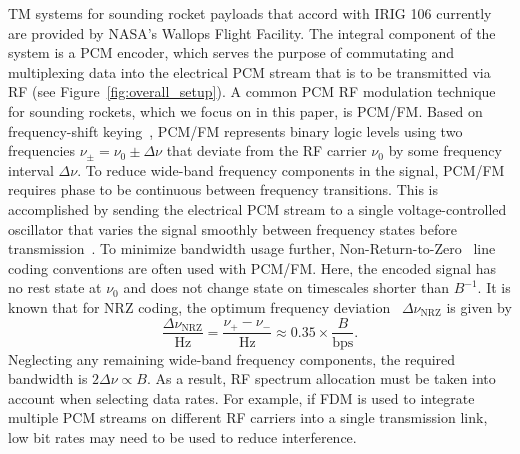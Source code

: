 \documentclass{ws-jai}
\begin{document}
TM systems for sounding rocket payloads that accord with IRIG 106 currently are provided by NASA's Wallops Flight Facility. The integral component of the system is a PCM encoder, which serves the purpose of commutating and multiplexing data into the electrical PCM stream that is to be transmitted via RF (see Figure~\ref{fig:overall_setup}). A common PCM RF modulation technique for sounding rockets, which we focus on in this paper, is PCM/FM. Based on frequency-shift keying~\cite{Wertz99}, PCM/FM represents binary logic levels using two frequencies $\nu_{\pm} = \nu_0 \pm \Delta \nu$ that deviate from the RF carrier $\nu_0$ by some frequency interval $\Delta \nu$. To reduce wide-band frequency components in the signal, PCM/FM requires phase to be continuous between frequency transitions. This is accomplished by sending the electrical PCM stream to a single voltage-controlled oscillator that varies the signal smoothly between frequency states before transmission~\cite{TM_RF08}. To minimize bandwidth usage further, Non-Return-to-Zero~\cite[NRZ;][]{TMapp06} line coding conventions are often used with PCM/FM. Here, the encoded signal has no rest state at $\nu_0$ and does not change state on timescales shorter than $B^{-1}$. It is known that for NRZ coding, the optimum frequency deviation~\cite{Kotelnikov60,Cartier77,TMapp06} $\Delta \nu_{\text{NRZ}}$ is given by 
\begin{equation}
\frac{\Delta \nu_{\text{NRZ}}}{\text{Hz}} = \frac{\nu_+ - \nu_-}{\text{Hz}} \approx 0.35 \times \frac{B}{\text{bps}} .
\end{equation}
Neglecting any remaining wide-band frequency components, the required bandwidth is $2 \Delta \nu \propto B$.  As a result, RF spectrum allocation must be taken into account when selecting data rates. For example, if FDM is used to integrate multiple PCM streams on different RF carriers into a single transmission link, low bit rates may need to be used to reduce interference.
\end{document}
